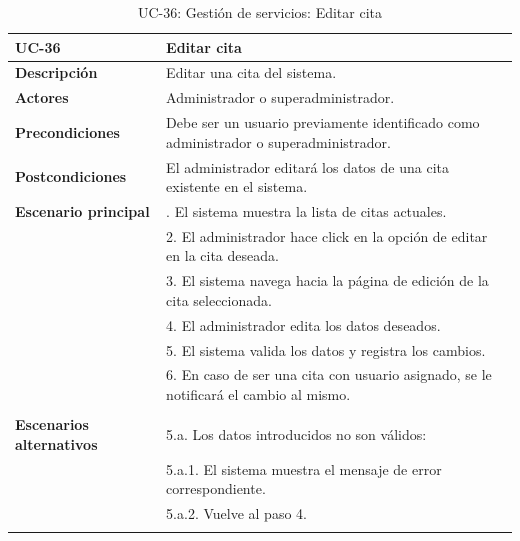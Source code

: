 \begin{table}[H]
  \begin{center}
    \begin{tabularx}{16.4cm}{|l|X|}
      \hline
      \textbf{UC-36} & \textbf{Editar cita}\\
      \hline
      \textbf{Descripción} & Editar una cita del sistema.\\
      \hline
      \textbf{Actores} & Administrador o superadministrador.\\
      \hline
      \textbf{Precondiciones} & Debe ser un usuario previamente identificado como administrador o superadministrador.\\
      \hline
      \textbf{Postcondiciones} & El administrador editará los datos de una cita existente en el sistema.\\
      \hline
      \textbf{Escenario principal} & \smallskip 1. El sistema muestra la lista de citas actuales.\\
      & 2. El administrador hace click en la opción de editar en la cita deseada.\\
      & 3. El sistema navega hacia la página de edición de la cita seleccionada.\\
      & 4. El administrador edita los datos deseados.\\
      & 5. El sistema valida los datos y registra los cambios.\\
      & 6. En caso de ser una cita con usuario asignado, se le notificará el cambio al mismo.\\
      & \\
      \hline
      \textbf{Escenarios alternativos} & \smallskip 5.a. Los datos introducidos no son válidos:\\
      & \hspace{0.3cm} 5.a.1. El sistema muestra el mensaje de error correspondiente.\\
      & \hspace{0.3cm} 5.a.2. Vuelve al paso 4.\\
      & \\
      \hline
    \end{tabularx}
    \caption{UC-36: Gestión de servicios: Editar cita}
    \label{tab:CU-editar-cita}
  \end{center}
\end{table}


